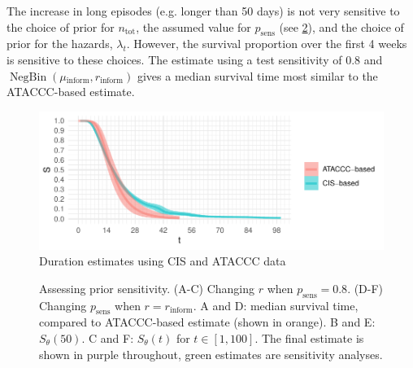 \documentclass[12pt]{article}
\DeclareMathOperator{\NBr}{NegBin}
\newcommand{\NBc}{\NBr}
\newcommand{\psens}{p_\text{sens}}
\newcommand{\ntot}{n_\text{tot}}
\newcommand{\inform}{{_{\text{inform}}}}
\begin{document}
The increase in long episodes (e.g. longer than 50 days) is not very sensitive to the choice of prior for $\ntot$, the assumed value for $\psens$ (see \cref{imperf-test:fig:cis-sensitivity}), and the choice of prior for the hazards, $\lambda_t$.
However, the survival proportion over the first 4 weeks is sensitive to these choices.
The estimate using a test sensitivity of 0.8 and $\NBc(\mu\inform, r\inform)$ gives a median survival time most similar to the ATACCC-based estimate.
\begin{figure}
  \centering \includegraphics{figures/output/CIS_final}
  \caption{Duration estimates using CIS and ATACCC data}
  \label{imperf-test:fig:cis-estimates}
\end{figure}
\begin{figure}
  \caption{%
    Assessing prior sensitivity.
    (A-C) Changing $r$ when $\psens = 0.8$.
    (D-F) Changing $\psens$ when $r = r\inform$.
    A and D: median survival time, compared to ATACCC-based estimate (shown in orange).
    B and E: $S_\theta(50)$.
    C and F: $S_\theta(t)$ for $t \in [1, 100]$.
    The final estimate is shown in purple throughout, green estimates are sensitivity analyses.
  }
  \label{imperf-test:fig:cis-sensitivity}
\end{figure}
\end{document}
